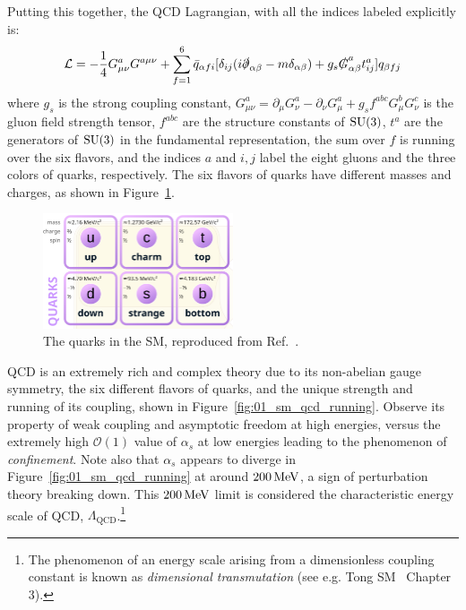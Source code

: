Putting this together, the QCD Lagrangian, with all the indices labeled explicitly is:
\begin{equation}
	\label{eq:01_sm_qcd_lagrangian}
	\mathcal L = -\frac{1}{4} G^a_{\mu\nu} G^{a\mu\nu} + \sum_{f = 1}^6 \bar q_{\alpha f i} [\delta_{ij}(i\slashed \partial_{\alpha\beta} - m \delta_{\alpha\beta}) + g_s \slashed G^a_{\alpha\beta} t_{ij}^a] q_{\beta f j}
\end{equation}
where $g_s$ is the strong coupling constant, $G^a_{\mu\nu} = \partial_\mu G^a_\nu - \partial_\nu G^a_\mu + g_s f^{abc} G^b_\mu G^c_\nu$ is the gluon field strength tensor, $f^{abc}$ are the structure constants of $\SU[3]$, $t^a$ are the generators of $\SU[3]$ in the fundamental representation, the sum over $f$ is running over the six flavors, and the indices $a$ and $i, j$ label the eight gluons and the three colors of quarks, respectively.
The six flavors of quarks have different masses and charges, as shown in Figure~\ref{fig:01_sm_qcd_quarks}.

\begin{figure}[ht]
	\centering
	\captionsetup{justification=centering}
	\includegraphics[width=0.5\textwidth]{figures/01-SM-03-SM/qcd/quarks.png}
	\caption{The quarks in the SM, reproduced from Ref.~\cite{enwiki:1238968997}.}
	\label{fig:01_sm_qcd_quarks}
\end{figure}

QCD is an extremely rich and complex theory due to its non-abelian gauge symmetry, the six different flavors of quarks, and the unique strength and running of its coupling, shown in Figure~\ref{fig:01_sm_qcd_running}.
Observe its property of weak coupling and asymptotic freedom at high energies, versus the extremely high $\mathcal O(1)$ value of $\alpha_s$ at low energies leading to the phenomenon of \textit{confinement}.
Note also that $\alpha_s$ appears to diverge in Figure~\ref{fig:01_sm_qcd_running} at around $200 \,\text{Me\hspace{-.08em}V}$, a sign of perturbation theory breaking down. 
This $200 \,\text{Me\hspace{-.08em}V}$ limit is considered the characteristic energy scale of QCD, $\Lambda_{\mathrm{QCD}}$.\footnote{The phenomenon of an energy scale arising from a dimensionless coupling constant  is known as \textit{dimensional transmutation} (see e.g. Tong SM~\cite{TongSM} Chapter 3).}

